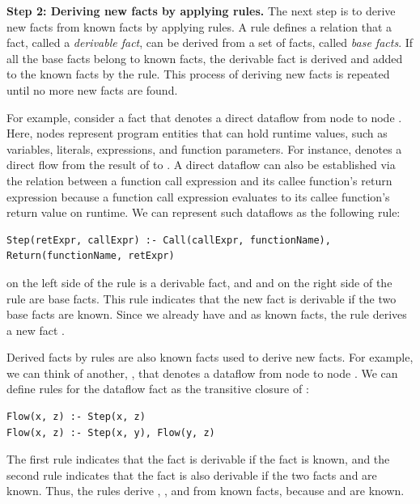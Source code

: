 \smallskip
\textbf{Step 2: Deriving new facts by applying rules.}
The next step is to derive new facts from known facts by applying rules.  A
rule defines a relation that a fact, called a {\it derivable fact}, can be
derived from a set of facts, called {\it base facts}.  If all the base facts
belong to known facts, the derivable fact is derived and added to the known
facts by the rule.  This process of deriving new facts is repeated until no
more new facts are found.


For example, consider a fact  that denotes a direct dataflow
from node  to node .  Here, nodes represent program
entities that can hold runtime values, such as variables, literals,
expressions, and function parameters.  For instance, 
denotes a direct flow from the result of  to  .  A direct
dataflow can also be established via the relation between a function call
expression and its callee function's return expression because a function call
expression evaluates to its callee function's return value on runtime.  We can
represent such dataflows as the following rule:
\begin{lstlisting}[style=mrule]
Step(retExpr, callExpr) :- Call(callExpr, functionName), Return(functionName, retExpr)
\end{lstlisting}

\noindent
{} on the left side of the rule is a derivable
fact, and  and  on the right side of the rule are base facts.  This rule indicates
that the new fact  is derivable if the two base
facts are known.  Since we already have  and  as known facts, the rule derives a new fact .

Derived facts by rules are also known facts used to derive new facts.  For
example, we can think of another, , that denotes a dataflow
from node  to node .  We can define rules for the dataflow
fact as the transitive closure of :

\begin{lstlisting}[style=mrule]
Flow(x, z) :- Step(x, z)
Flow(x, z) :- Step(x, y), Flow(y, z)
\end{lstlisting}

\noindent
The first rule indicates that the fact  is derivable if the
fact  is known, and the second rule indicates that the fact
 is also derivable if the two facts  and
 are known.  Thus, the rules derive ,
, and  from known facts, because
 and  are known.

